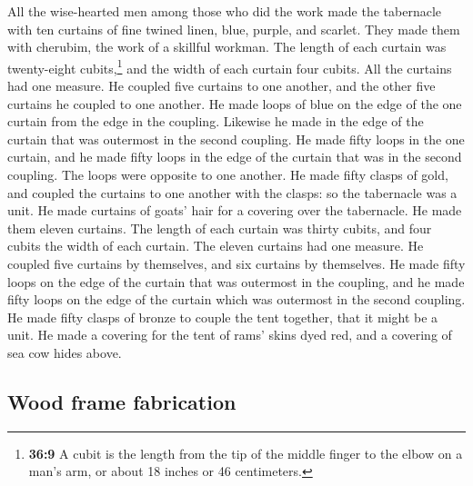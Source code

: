  All the wise-hearted men among those who did the work
made the tabernacle with ten curtains of fine twined linen, blue,
purple, and scarlet. They made them with cherubim, the work of a
skillful workman.  The length of each curtain was
twenty-eight cubits,\footnote{\textbf{36:9} A cubit is the length from
  the tip of the middle finger to the elbow on a man's arm, or about 18
  inches or 46 centimeters.} and the width of each curtain four cubits.
All the curtains had one measure.  He coupled five
curtains to one another, and the other five curtains he coupled to one
another.  He made loops of blue on the edge of the one
curtain from the edge in the coupling. Likewise he made in the edge of
the curtain that was outermost in the second coupling. 
He made fifty loops in the one curtain, and he made fifty loops in the
edge of the curtain that was in the second coupling. The loops were
opposite to one another.  He made fifty clasps of gold,
and coupled the curtains to one another with the clasps: so the
tabernacle was a unit.  He made curtains of goats' hair
for a covering over the tabernacle. He made them eleven curtains.
 The length of each curtain was thirty cubits, and four
cubits the width of each curtain. The eleven curtains had one measure.
 He coupled five curtains by themselves, and six curtains
by themselves.  He made fifty loops on the edge of the
curtain that was outermost in the coupling, and he made fifty loops on
the edge of the curtain which was outermost in the second coupling.
 He made fifty clasps of bronze to couple the tent
together, that it might be a unit.  He made a covering
for the tent of rams' skins dyed red, and a covering of sea cow hides
above.

\hypertarget{wood-frame-fabrication}{%
\subsection{Wood frame fabrication}\label{wood-frame-fabrication}}

